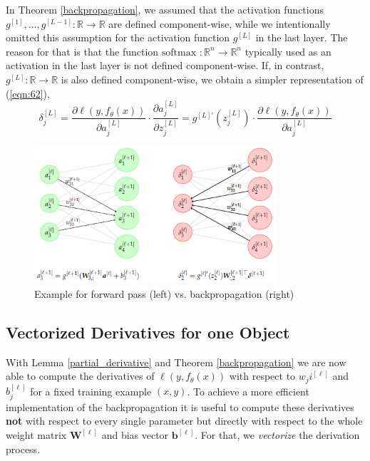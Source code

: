 \begin{remark}
In Theorem \ref{backpropagation}, we assumed that the activation functions $g^{[1]}, \ldots, g^{[L-1]}: \mathbb{R} \rightarrow \mathbb{R}$ are defined component-wise, while we intentionally
omitted this assumption for the activation function $g^{[L]}$ in the last layer. The reason for that is that the function $\text{softmax }: \mathbb{R}^n \rightarrow \mathbb{R}^n$ typically used as an activation in the last layer is not defined component-wise. If, in contrast, $g^{[L]}: \mathbb{R} \rightarrow \mathbb{R}$ is also defined component-wise, we obtain a simpler representation of (\ref{eqn:62}),
\begin{equation}
    \delta_j^{[L]} = \frac{\partial \ell(y, f_\theta(x))}{\partial a_j^{[L]}} \cdot \frac{\partial a_j^{[L]}}{\partial z_j^{[L]}} = g^{[L]'} \left( z_{j}^{[L]} \right) \cdot \frac{\partial \ell(y, f_\theta(x))}{\partial a_j^{[L]}}
    \label{eqn:67}
\end{equation}
\end{remark}

\begin{figure}[h!]
    \centering
    \includegraphics[width=0.8\textwidth]{images/figure11.png}
    \caption{Example for forward pass (left) vs. backpropagation (right)}
    \label{fig:11}
\end{figure}

\subsection{Vectorized Derivatives for one Object}
With Lemma \ref{partial_derivative} and Theorem \ref{backpropagation} we are now able to compute the derivatives of $\ell(y, f_\theta(x))$ with respect to $w_ji^{[\ell]}$ and $b_j^{[\ell]}$ for a fixed training example $(x, y)$. To achieve a more efficient implementation of the backpropagation it is useful to compute these derivatives \textbf{not} with respect to every single parameter but directly with respect to the whole weight matrix $\boldsymbol{W}^{[\ell]}$ and bias vector $\boldsymbol{b}^{[\ell]}$. For that, we \emph{vectorize} the derivation process.

